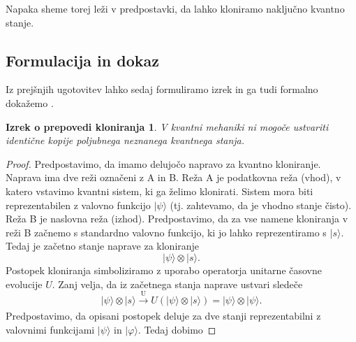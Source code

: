 \documentclass[12pt]{article}
\newtheorem*{remark}{Izrek o prepovedi kloniranja}
\begin{document}
\par Napaka sheme torej leži v predpostavki, da lahko kloniramo naključno kvantno stanje.

 \subsection{Formulacija in dokaz}
 
 Iz prejšnjih ugotovitev lahko sedaj formuliramo izrek in ga tudi formalno dokažemo \cite{nielsenQuantumComputationQuantum2012}.

 
\begin{remark} V kvantni mehaniki ni mogoče ustvariti identične kopije poljubnega neznanega kvantnega stanja. 
\end{remark}

\begin{proof}
Predpostavimo, da imamo delujočo napravo za kvantno kloniranje. Naprava ima dve reži označeni z A in B. Reža A je podatkovna reža (vhod), v katero vstavimo kvantni sistem, ki ga želimo klonirati. Sistem mora biti reprezentabilen z valovno funkcijo $| \psi \rangle$ (tj. zahtevamo, da je vhodno stanje čisto). Reža B je naslovna reža (izhod). Predpostavimo, da za vse namene kloniranja v reži B začnemo s standardno valovno funkcijo, ki jo lahko reprezentiramo s $| s \rangle$. Tedaj je začetno stanje naprave za kloniranje
\begin{equation}
| \psi \rangle \otimes | s \rangle.
\end{equation}
Postopek kloniranja simboliziramo z uporabo operatorja unitarne časovne evolucije $U$. Zanj velja, da iz začetnega stanja naprave ustvari sledeče
\begin{equation}
| \psi \rangle \otimes | s \rangle \xrightarrow[\text{}]{\text{U}} U(| \psi \rangle \otimes | s \rangle) = | \psi \rangle \otimes | \psi \rangle.
\end{equation}
Predpostavimo, da opisani postopek deluje za dve stanji reprezentabilni z valovnimi funkcijami $| \psi \rangle$ in $| \varphi \rangle$. Tedaj dobimo 


\end{proof}
\end{document}
